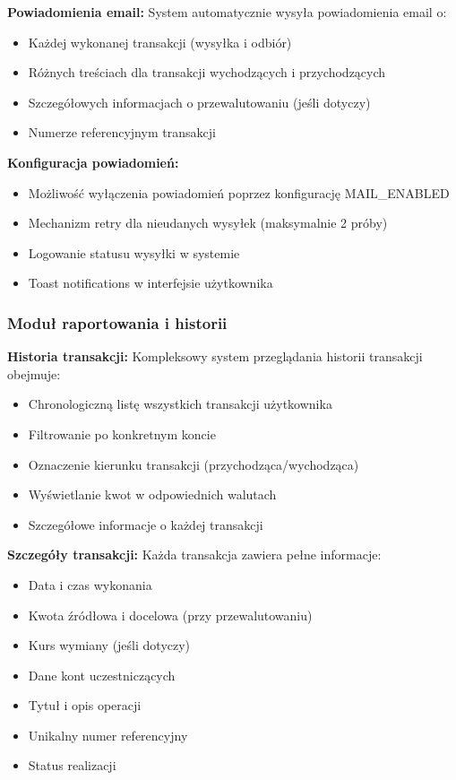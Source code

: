 \documentclass[12pt,a4paper]{article}
\begin{document}
    \textbf{Powiadomienia email:}
    System automatycznie wysyła powiadomienia email o:
    \begin{itemize}
        \item Każdej wykonanej transakcji (wysyłka i odbiór)
        \item Różnych treściach dla transakcji wychodzących i przychodzących
        \item Szczegółowych informacjach o przewalutowaniu (jeśli dotyczy)
        \item Numerze referencyjnym transakcji
    \end{itemize}

    \textbf{Konfiguracja powiadomień:}
    \begin{itemize}
        \item Możliwość wyłączenia powiadomień poprzez konfigurację MAIL\_ENABLED
        \item Mechanizm retry dla nieudanych wysyłek (maksymalnie 2 próby)
        \item Logowanie statusu wysyłki w systemie
        \item Toast notifications w interfejsie użytkownika
    \end{itemize}

    \subsubsection{Moduł raportowania i historii}

    \textbf{Historia transakcji:}
    Kompleksowy system przeglądania historii transakcji obejmuje:
    \begin{itemize}
        \item Chronologiczną listę wszystkich transakcji użytkownika
        \item Filtrowanie po konkretnym koncie
        \item Oznaczenie kierunku transakcji (przychodząca/wychodząca)
        \item Wyświetlanie kwot w odpowiednich walutach
        \item Szczegółowe informacje o każdej transakcji
    \end{itemize}

    \textbf{Szczegóły transakcji:}
    Każda transakcja zawiera pełne informacje:
    \begin{itemize}
        \item Data i czas wykonania
        \item Kwota źródłowa i docelowa (przy przewalutowaniu)
        \item Kurs wymiany (jeśli dotyczy)
        \item Dane kont uczestniczących
        \item Tytuł i opis operacji
        \item Unikalny numer referencyjny
        \item Status realizacji
    \end{itemize}
\end{document}

